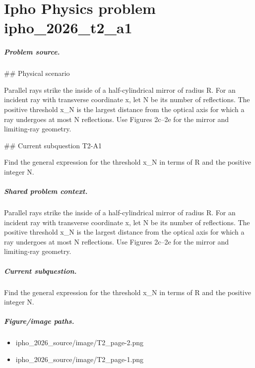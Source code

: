 
\chapter{Ipho Physics problem ipho\_2026\_t2\_a1}
\label{ch:IPhO2026Problems_problem_ipho_2026_t2_a1}

\paragraph{Problem source.}
\#\# Physical scenario

Parallel rays strike the inside of a half-cylindrical mirror of radius R.  For
an incident ray with transverse coordinate x, let N be its number of
reflections.  The positive threshold x\_N is the largest distance from the
optical axis for which a ray undergoes at most N reflections.  Use Figures
2c--2e for the mirror and limiting-ray geometry.

\#\# Current subquestion T2-A1

Find the general expression for the threshold x\_N in terms of R and the positive integer N.

\paragraph{Shared problem context.}
Parallel rays strike the inside of a half-cylindrical mirror of radius R.  For
an incident ray with transverse coordinate x, let N be its number of
reflections.  The positive threshold x\_N is the largest distance from the
optical axis for which a ray undergoes at most N reflections.  Use Figures
2c--2e for the mirror and limiting-ray geometry.

\paragraph{Current subquestion.}
Find the general expression for the threshold x\_N in terms of R and the positive integer N.

\paragraph{Figure/image paths.}
\begin{itemize}
\item ipho\_2026\_source/image/T2\_page-2.png
\item ipho\_2026\_source/image/T2\_page-1.png
\end{itemize}

